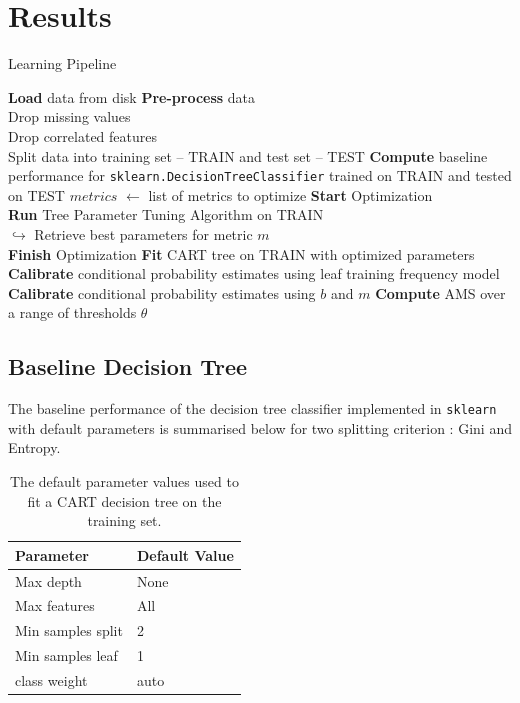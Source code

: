 \documentclass[final,3p,times,twocolumn]{elsarticle}
\begin{document}
\section{Results}
\label{results}

\begin{algorithm}
\caption{Learning Pipeline}
\begin{algorithmic}[1]
\STATE \textbf{Load} data from disk 
\STATE \textbf{Pre-process} data  \\
\qquad Drop missing values \\
\qquad Drop correlated features \\
\qquad Split data into training set -- TRAIN and test set -- TEST 
\STATE \textbf{Compute} baseline performance for \texttt{sklearn.DecisionTreeClassifier} trained on TRAIN and tested on TEST
\STATE $metrics$ $\leftarrow$ list of metrics to optimize  
\STATE \textbf{Start} Optimization \\
\STATE \quad  \textbf{Run} Tree Parameter Tuning Algorithm on TRAIN \\
\qquad $\hookrightarrow$ Retrieve best parameters for metric $m$ \\  
\ENDFOR
\STATE \textbf{Finish} Optimization 
\STATE \textbf{Fit} CART tree on TRAIN with optimized parameters
\STATE \textbf{Calibrate} conditional probability estimates using leaf training frequency model
\STATE \textbf{Calibrate} conditional probability estimates using $b$ and $m$
\STATE \textbf{Compute} AMS over a range of thresholds $\theta$ 
\end{algorithmic}
\end{algorithm}
\subsection{Baseline Decision Tree}
\label{base}

The baseline performance of the decision tree classifier implemented in \texttt{sklearn} with default parameters is summarised below for two splitting criterion : Gini and Entropy.

\begin{table}
\centering
\begin{tabular}{l|l}
Parameter & Default Value \\
\toprule
Max depth & None \\
Max features & All\\
Min samples split & 2\\
Min samples leaf & 1\\
class weight & auto\\
\end{tabular}
\caption{The default parameter values used to fit a CART decision tree on the training set.}
\end{table}
\end{document}
